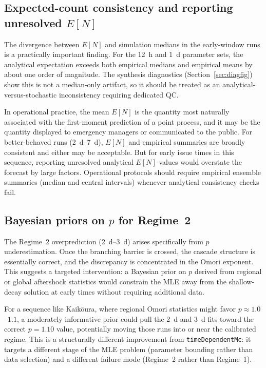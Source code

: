 \documentclass[12pt,letterpaper]{article}
\begin{document}
\subsection{Expected-count consistency and reporting unresolved $E[N]$}

The divergence between $E[N]$ and simulation medians in the early-window runs
is a practically important finding. For the 12~h and 1~d parameter sets, the
analytical expectation exceeds both empirical medians and empirical means by
about one order of magnitude. The synthesis diagnostics (Section~\ref{sec:diagfig})
show this is not a median-only artifact, so it should be treated as an
analytical-versus-stochastic inconsistency requiring dedicated QC.

In operational practice, the mean $E[N]$ is the quantity most naturally
associated with the first-moment prediction of a point process, and it may be
the quantity displayed to emergency managers or communicated to the public. For
better-behaved runs (2~d--7~d), $E[N]$ and empirical summaries are broadly
consistent and either may be acceptable. But for early issue times in this
sequence, reporting unresolved analytical $E[N]$ values would overstate the
forecast by large factors. Operational protocols should require empirical
ensemble summaries (median and central intervals) whenever analytical
consistency checks fail.

\subsection{Bayesian priors on $p$ for Regime~2}

The Regime~2 overprediction (2~d--3~d) arises specifically from $p$
underestimation. Once the branching barrier is crossed, the cascade structure
is essentially correct, and the discrepancy is concentrated in the Omori
exponent. This suggests a targeted intervention: a Bayesian prior on $p$
derived from regional or global aftershock statistics would constrain the MLE
away from the shallow-decay solution at early times without requiring additional
data.

For a sequence like Kaik\={o}ura, where regional Omori statistics might favor
$p\approx1.0$--$1.1$, a moderately informative prior could pull the 2~d and
3~d fits toward the correct $p=1.10$ value, potentially moving those runs into
or near the calibrated regime. This is a structurally different improvement
from \texttt{timeDependentMc}: it targets a different stage of the MLE problem
(parameter bounding rather than data selection) and a different failure mode
(Regime~2 rather than Regime~1).
\end{document}
